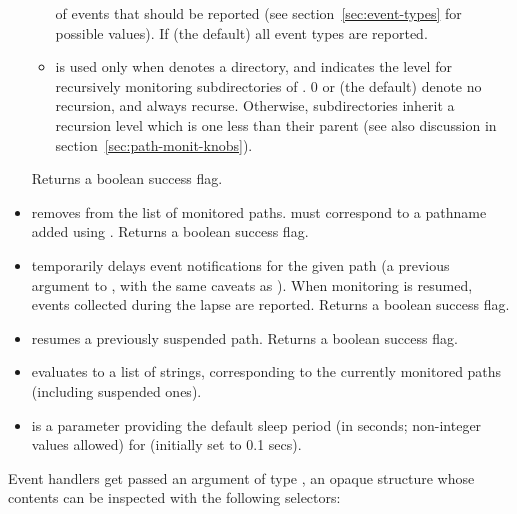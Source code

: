 \begin{itemize}
\begin{itemize}
    of events that should be reported (see
    section~\ref{sec:event-types} for possible values). If 
    (the default) all event types are reported.
  \item {} is used only when  denotes a
    directory, and indicates the level for recursively monitoring
    subdirectories of . 0 or  (the default) denote
    no recursion, and  always recurse. Otherwise,
    subdirectories inherit a recursion level which is one less than
    their parent (see also discussion in
    section~\ref{sec:path-monit-knobs}).
  \end{itemize}
  Returns a boolean success flag.
\item{} removes 
  from the list of monitored paths.  must correspond to a
  pathname added using . Returns a boolean success flag.
\item{} temporarily
  delays event notifications for the given path (a previous argument
  to , with the same caveats as
  ). When monitoring is resumed, events
  collected during the lapse are reported. Returns a boolean success
  flag.
\item{} resumes a
  previously suspended path. Returns a boolean success flag.
\item{} evaluates to a list of
  strings, corresponding to the currently monitored paths (including
  suspended ones).
\item{} is a parameter providing the default
  sleep period (in seconds; non-integer values allowed) for
   (initially set to 0.1 secs).
\end{itemize}
Event handlers get passed an argument of type , an
opaque structure whose contents can be inspected with the following
selectors:
